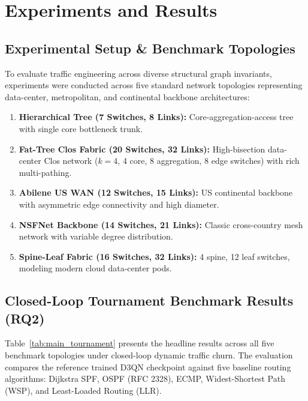\documentclass[12pt,a4paper,oneside]{report}
\begin{document}
\chapter{Experiments and Results}
\label{chap:results}

\section{Experimental Setup \& Benchmark Topologies}
To evaluate traffic engineering across diverse structural graph invariants, experiments were conducted across five standard network topologies representing data-center, metropolitan, and continental backbone architectures:
\begin{enumerate}
  \item \textbf{Hierarchical Tree (7 Switches, 8 Links):} Core-aggregation-access tree with single core bottleneck trunk.
  \item \textbf{Fat-Tree Clos Fabric (20 Switches, 32 Links):} High-bisection data-center Clos network ($k=4$, 4 core, 8 aggregation, 8 edge switches) with rich multi-pathing.
  \item \textbf{Abilene US WAN (12 Switches, 15 Links):} US continental backbone with asymmetric edge connectivity and high diameter.
  \item \textbf{NSFNet Backbone (14 Switches, 21 Links):} Classic cross-country mesh network with variable degree distribution.
  \item \textbf{Spine-Leaf Fabric (16 Switches, 32 Links):} 4 spine, 12 leaf switches, modeling modern cloud data-center pods.
\end{enumerate}

\section{Closed-Loop Tournament Benchmark Results (RQ2)}
Table~\ref{tab:main_tournament} presents the headline results across all five benchmark topologies under closed-loop dynamic traffic churn. The evaluation compares the reference trained D3QN checkpoint against five baseline routing algorithms: Dijkstra SPF, OSPF (RFC 2328), ECMP, Widest-Shortest Path (WSP), and Least-Loaded Routing (LLR).
\end{document}
